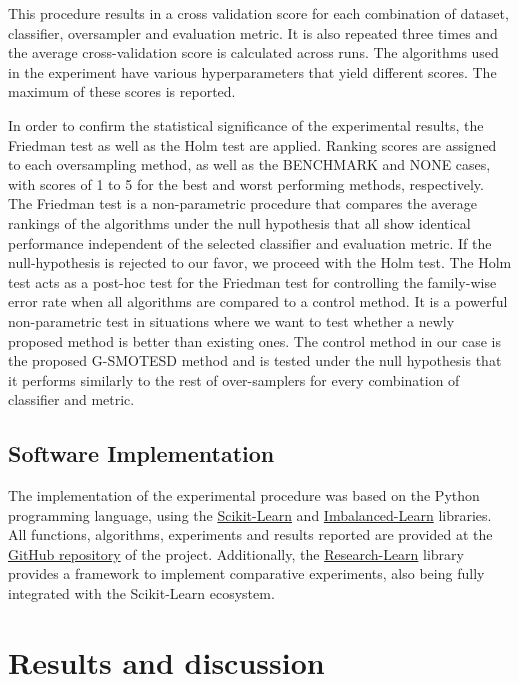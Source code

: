 \documentclass[parskip=full]{scrartcl}
\begin{document}
This procedure results in a cross validation score for each combination of dataset, classifier, oversampler and evaluation metric. It is also repeated three times and the average cross-validation score is calculated across runs. The algorithms used in the experiment have various hyperparameters that yield different scores. The maximum of these scores is reported.

In order to confirm the statistical significance of the experimental results, the Friedman test as well as the Holm test \cite{JanezDemsar.2006} are applied. Ranking scores are assigned to each oversampling method, as well as the BENCHMARK and NONE cases, with scores of 1 to 5 for the best and worst performing methods, respectively. The Friedman test is a non-parametric procedure that compares the average rankings of the algorithms under the null hypothesis that all show identical performance independent of the selected classifier and evaluation metric. If the null-hypothesis is rejected to our favor, we proceed with the Holm test. The Holm test acts as a post-hoc test for the Friedman test for controlling the family-wise error rate when all algorithms are compared to a control method. It is a powerful non-parametric test in situations where we want to test whether a newly proposed method is better than existing ones. The control method in our case is the proposed G-SMOTESD method and is tested under the null hypothesis that it performs similarly to the rest of over-samplers for every combination of classifier and metric.

\subsection{Software Implementation}

The implementation of the experimental procedure was based on the Python
programming language, using the \href{https://scikit-learn.org/stable/}{Scikit-Learn} \cite{Pedregosa.2011} and \href{https://imbalanced-learn.org/en/stable/}{Imbalanced-Learn} \cite{Lemaitre.2017} libraries. All functions, algorithms, experiments and results reported are provided at the \href{https://github.com/AlgoWit/publications/tree/master/small-data-oversampling}{GitHub repository} of the project. Additionally, the \href{https://research-learn.readthedocs.io/en/latest/?badge=latest}{Research-Learn} library provides a framework to implement comparative experiments, also being fully integrated with the Scikit-Learn ecosystem.

\section{Results and discussion}
\label{results}
\end{document}
